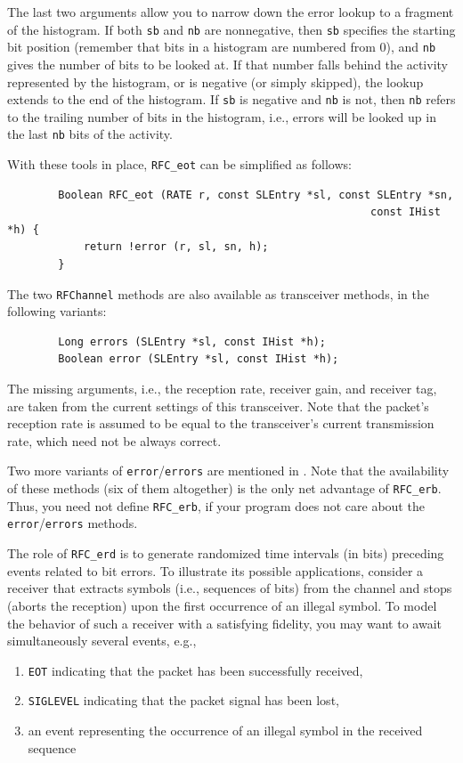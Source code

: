 The last two arguments allow you to narrow down the error lookup to a
fragment of the histogram.
If both {\tt sb} and {\tt nb} are nonnegative, then {\tt sb} specifies
the starting bit position (remember that bits in a histogram
are numbered from 0), and {\tt nb} gives the number of bits to be looked at.
If that number falls behind the activity represented by the histogram, or
is negative (or simply skipped), the lookup extends to the end of the
histogram.
If {\tt sb} is negative and {\tt nb} is not, then {\tt nb} refers to the
trailing number of bits in the histogram, i.e., errors will be looked up in
the last {\tt nb} bits of the activity.

With these tools in place, {\tt RFC\_eot} can be simplified as follows:
\begin{verbatim}
        Boolean RFC_eot (RATE r, const SLEntry *sl, const SLEntry *sn,
                                                         const IHist *h) {
            return !error (r, sl, sn, h);
        }
\end{verbatim}

The two {\tt RFChannel} methods are also available as transceiver
methods, in the following variants:
\begin{verbatim}
        Long errors (SLEntry *sl, const IHist *h);
        Boolean error (SLEntry *sl, const IHist *h);
\end{verbatim}
\noindent
The missing arguments, i.e., the reception rate, receiver gain, and
receiver tag,
are taken from the current settings of this transceiver.
Note that the packet's 
reception rate is assumed to be equal to the transceiver's current
transmission rate, which need not be always correct.

Two more variants of {\tt error}/{\tt errors} are mentioned in 
.
Note that the availability of
these methods (six of them altogether)
is the only net advantage of {\tt RFC\_erb}.
Thus, you need not define {\tt RFC\_erb}, if your
program does not care about the {\tt error}/{\tt errors} methods.

The role of {\tt RFC\_erd} is to generate randomized time intervals (in bits)
preceding events related to bit errors.
To illustrate its possible applications, consider a receiver that extracts
symbols (i.e., sequences of bits) from the channel and stops (aborts the
reception) upon the first occurrence of an illegal symbol.
To model the behavior of such a receiver with a satisfying fidelity, you may
want to await simultaneously several events, e.g.,
\begin{enumerate}
\item
{\tt EOT} indicating that the packet has been successfully received,
\item
{\tt SIGLEVEL} indicating that the packet signal has been lost,
\item
an event representing the occurrence of an illegal symbol in the received
sequence
\end{enumerate}

